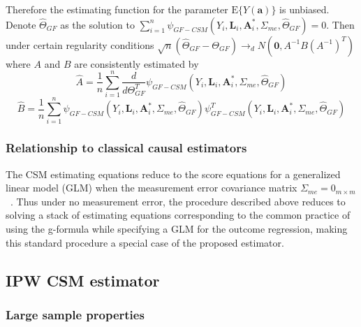 \documentclass[12pt]{article}
\begin{document}
Therefore the estimating function for the parameter $\text{E} \{ Y(\bm{a}) \}$ is unbiased. Denote $\hat{\Theta}_{GF}$ as the solution to $\sum_{i=1}^{n} \psi_{GF-CSM}(Y_{i}, \bm{L}_{i}, \bm{A}^{*}_{i}, \Sigma_{me}, \hat{\Theta}_{GF}) = 0$. Then under certain regularity conditions $\sqrt{n}(\hat{\Theta}_{GF} - \Theta_{GF}) \rightarrow_{d} N(\bm{0}, A^{-1}B(A^{-1})^{T})$ where $A$ and $B$ are consistently estimated by
\begin{equation*}
\hat{A} = \frac{1}{n} \sum_{i=1}^{n} \frac{d}{d\Theta_{GF}^{T}} \psi_{GF-CSM}(Y_{i}, \bm{L}_{i}, \bm{A}^{*}_{i}, \Sigma_{me}, \hat{\Theta}_{GF})
\end{equation*}
\begin{equation*}
\hat{B} = \frac{1}{n} \sum_{i=1}^{n} \psi_{GF-CSM}(Y_{i}, \bm{L}_{i}, \bm{A}^{*}_{i}, \Sigma_{me}, \hat{\Theta}_{GF}) \psi^{T}_{GF-CSM}(Y_{i}, \bm{L}_{i}, \bm{A}^{*}_{i}, \Sigma_{me}, \hat{\Theta}_{GF})
\end{equation*}

\subsubsection{Relationship to classical causal estimators}

The CSM estimating equations reduce to the score equations for a generalized linear model (GLM) when the measurement error covariance matrix $\Sigma_{me} = 0_{m \times m}$~\citep{carroll2006}. Thus under no measurement error, the procedure described above reduces to solving a stack of estimating equations corresponding to the common practice of using the g-formula while specifying a GLM for the outcome regression, making this standard procedure a special case of the proposed estimator.

\subsection{IPW CSM estimator}

\subsubsection{Large sample properties}
\end{document}
